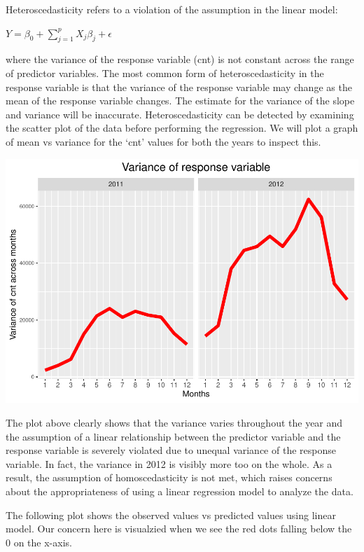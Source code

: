\documentclass[
]{article}
\begin{document}
Heteroscedasticity refers to a violation of the assumption in the linear
model:

\(Y = \beta_{0} + \sum\limits_{j=1} ^ {p} X_{j}\beta_{j} + \epsilon\)

where the variance of the response variable (cnt) is not constant across
the range of predictor variables. The most common form of
heteroscedasticity in the response variable is that the variance of the
response variable may change as the mean of the response variable
changes. The estimate for the variance of the slope and variance will be
inaccurate. Heteroscedasticity can be detected by examining the scatter
plot of the data before performing the regression. We will plot a graph
of mean vs variance for the `cnt' values for both the years to inspect
this.

\includegraphics{draft_files/figure-latex/unnamed-chunk-7-1.pdf}

The plot above clearly shows that the variance varies throughout the
year and the assumption of a linear relationship between the predictor
variable and the response variable is severely violated due to unequal
variance of the response variable. In fact, the variance in 2012 is
visibly more too on the whole. As a result, the assumption of
homoscedasticity is not met, which raises concerns about the
appropriateness of using a linear regression model to analyze the data.

The following plot shows the observed values vs predicted values using
linear model. Our concern here is visualzied when we see the red dots
falling below the 0 on the x-axis.
\end{document}
